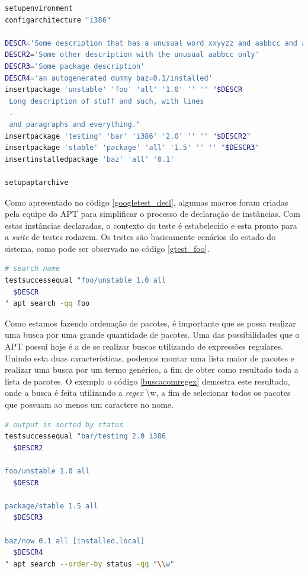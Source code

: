\begin{lstlisting}[language=Bash,label=googletest_decl,caption={Declarações de instâncias para o teste}]
setupenvironment
configarchitecture "i386"

DESCR='Some description that has a unusual word xxyyzz and aabbcc and a UPPERCASE'
DESCR2='Some other description with the unusual aabbcc only'
DESCR3='Some package description'
DESCR4='an autogenerated dummy baz=0.1/installed'
insertpackage 'unstable' 'foo' 'all' '1.0' '' '' "$DESCR
 Long description of stuff and such, with lines
 .
 and paragraphs and everything."
insertpackage 'testing' 'bar' 'i386' '2.0' '' '' "$DESCR2"
insertpackage 'stable' 'package' 'all' '1.5' '' '' "$DESCR3"
insertinstalledpackage 'baz' 'all' '0.1'

setupaptarchive
\end{lstlisting}

Como apresentado no código \ref{googletest_decl}, algumas macros foram criadas pela equipe do APT para simplificar o processo de declaração de instâncias. Com estas instâncias declaradas, o contexto do teste é estabelecido e esta pronto para a \textit{suite} de testes rodarem. Os testes são basicamente cenários do estado do sistema, como pode ser observado no código \ref{gtest_foo}.

\begin{lstlisting}[language=Bash,label=gtest_foo,caption={Teste por busca pelo pacote \textit{foo}}]
# search name
testsuccessequal "foo/unstable 1.0 all
  $DESCR
" apt search -qq foo
\end{lstlisting}

Como estamos fazendo ordenação de pacotes, é importante que se possa realizar uma busca por uma grande quantidade de pacotes. Uma das possibilidades que o APT possui hoje é a de se realizar buscas utilizando de expressões regulares. Unindo esta duas características, podemos montar uma lista maior de pacotes e realizar uma busca por um termo genérico, a fim de obter como resultado toda a lista de pacotes. O exemplo o código \ref{buscacomregex} demostra este resultado, onde a busca é feita utilizando a \textit{regex} {\code \textbackslash w}, a fim de selecionar todos os pacotes que possuam ao menos um caractere no nome.

\begin{lstlisting}[language=Bash,label=buscacomregex,caption={Teste por busca pelo pacote \textit{foo}}]
# output is sorted by status
testsuccessequal "bar/testing 2.0 i386
  $DESCR2

foo/unstable 1.0 all
  $DESCR

package/stable 1.5 all
  $DESCR3

baz/now 0.1 all [installed,local]
  $DESCR4
" apt search --order-by status -qq "\\w"
\end{lstlisting}

